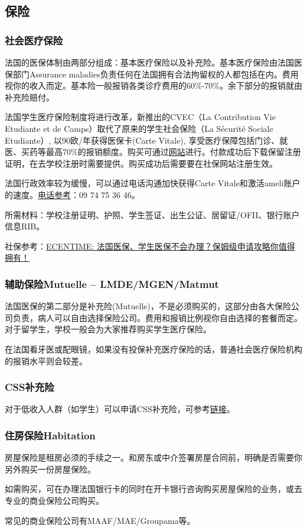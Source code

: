 \subsection{保险}
\subsubsection{社会医疗保险}

法国的医保体制由两部分组成：基本医疗保险以及补充险。基本医疗保险由法国医保部门Assurance maladies负责任何在法国拥有合法拘留权的人都包括在内。费用视你的收入而定。基本险一般报销各类诊疗费用的60\%-70\%。余下部分的报销就由补充险赔付。

法国学生医疗保险制度将进行改革，新推出的CVEC（La Contribution Vie Etudiante et de Camps）取代了原来的学生社会保险（La Sécurité Sociale Etudiante）, 以90欧/年获得医保卡(Carte Vitale), 享受医疗保障包括门诊、就医、买药等最高70\%的报销额度。购买可通过\href{https://www.messervices.etudiant.gouv.fr}{网站}进行。付款成功后下载保留注册证明，在去学校注册时需要提供。购买成功后需要要在社保网站注册生效。

法国行政效率较为缓慢，可以通过电话沟通加快获得Carte Vitale和激活ameli账户的速度。\href{https://www.ameli.fr/paris/assure/english-pages}{电话参考}：09 74 75 36 46。

所需材料：学校注册证明、护照、学生签证、出生公证、居留证/OFII、银行账户信息RIB。

社保参考：\href{https://www.ecentime.com/article/assurance-maladie}{ECENTIME: 法国医保、学生医保不会办理？保姆级申请攻略你值得拥有！}
 
\subsubsection{辅助保险Mutuelle – LMDE/MGEN/Matmut}

法国医保的第二部分是补充险(Mutuelle)，不是必须购买的，这部分由各大保险公司负责，病人可以自由选择保险公司。费用和报销比例视你自由选择的套餐而定。对于留学生，学校一般会为大家推荐购买学生医疗保险。

在法国看牙医或配眼镜，如果没有投保补充医疗保险的话，普通社会医疗保险机构的报销水平则会较差。

\subsubsection{CSS补充险}
对于低收入人群（如学生）可以申请CSS补充险，可参考\href{https://www.xiaohongshu.com/explore/6244b05d00000000210386be?note_flow_source=wechat}{链接}。

\subsubsection{住房保险Habitation} 
房屋保险是租房必须的手续之一。和房东或中介签署房屋合同前，明确是否需要你另外购买一份房屋保险。

如需购买，可在办理法国银行卡的同时在开卡银行咨询购买房屋保险的业务，或去专业的商业保险公司购买。

常见的商业保险公司有MAAF/MAE/Groupama等。
